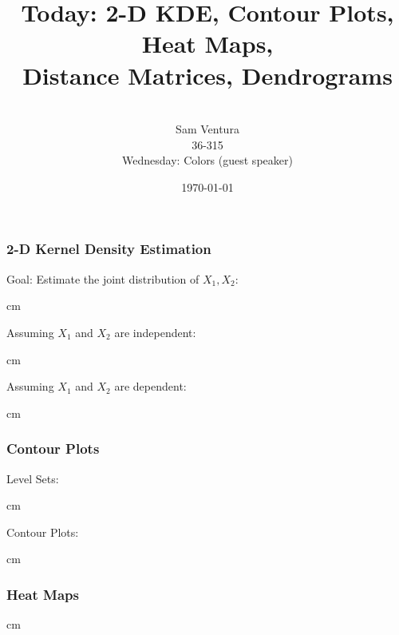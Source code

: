 \documentclass{beamer} %
\begin{document}
\title[]{Today:  2-D KDE, Contour Plots, Heat Maps, \\Distance Matrices, Dendrograms}


\author[Samuel L. Ventura]{\\
  \large{Sam Ventura\\36-315\\Wednesday:  Colors (guest speaker)}}
\date{\today}


\begin{frame}
	\maketitle

	
\end{frame}




\begin{frame}\frametitle{2-D Kernel Density Estimation}
	\small
	
	Goal:  Estimate the joint distribution of $X_1, X_2$:
	
	 cm
	
	Assuming $X_1$ and $X_2$ are independent:
	
	 cm
	
	Assuming $X_1$ and $X_2$ are dependent:
	
	 cm
	
\end{frame}


\begin{frame}\frametitle{Contour Plots}
	\small
	
	Level Sets:
	
	 cm
	
	Contour Plots:
	
	 cm
	
\end{frame}


\begin{frame}\frametitle{Heat Maps}
	\small
	
	
	 cm
	
\end{frame}
\end{document}
